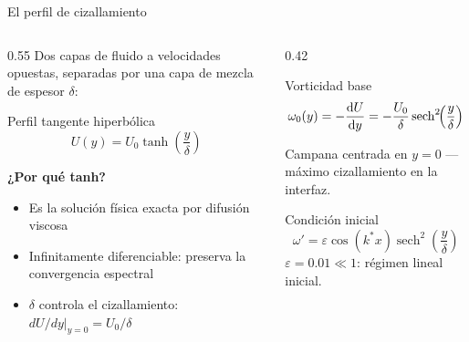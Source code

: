 \documentclass[aspectratio=169, 12pt]{beamer}
\begin{document}
\begin{frame}{El perfil de cizallamiento}
  \begin{columns}
    \begin{column}{0.55\textwidth}
      Dos capas de fluido a velocidades opuestas, separadas por
      una capa de mezcla de espesor $\delta$:

      \begin{block}{Perfil tangente hiperbólica}
        \[
          U(y) = U_0\tanh\!\left(\frac{y}{\delta}\right)
        \]
      \end{block}

      \vspace{0.4em}
      \textbf{¿Por qué tanh?}
      \begin{itemize}
        \item Es la solución física exacta por difusión viscosa
        \item Infinitamente diferenciable: preserva la convergencia espectral
        \item $\delta$ controla el cizallamiento: $dU/dy\big|_{y=0} = U_0/\delta$
      \end{itemize}
    \end{column}
    \begin{column}{0.42\textwidth}
      \begin{block}{Vorticidad base}
        \[
          \omega_0(y) = -\dv{U}{y}
          = -\frac{U_0}{\delta}\operatorname{sech}^2\!\!\left(\frac{y}{\delta}\right)
        \]
      \end{block}

      \vspace{0.3em}
      Campana centrada en $y=0$ — máximo cizallamiento en la interfaz.

      \vspace{0.4em}
      \begin{alertblock}{Condición inicial}
        \[
          \omega' = \varepsilon\cos(k^*x)\operatorname{sech}^2\!\!\left(\frac{y}{\delta}\right)
        \]
        $\varepsilon = 0.01 \ll 1$: régimen lineal inicial.
      \end{alertblock}
    \end{column}
  \end{columns}
\end{frame}
\end{document}
